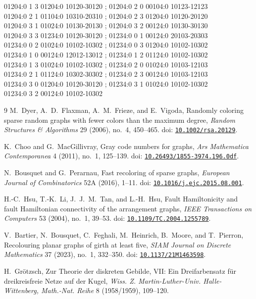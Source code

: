 \documentclass[11pt]{article}
\newcommand{\doi}[1]{doi: \href{https://doi.org/#1}{\nolinkurl{#1}}}
\theoremstyle{remark}
\numberwithin{equation}{section}
\begin{document}
\begin{flushleft}
01204:0 1 3 01204:0 10120-30120 ; 01204:0 2 0 00104:0 10123-12123\\
01204:0 2 1 01104:0 10310-20310 ; 01204:0 2 3 01204:0 10120-20120\\
01204:0 3 1 01024:0 10130-20130 ; 01204:0 3 2 00124:0 10130-30130\\
01204:0 3 3 01234:0 10120-30120 ; 01234:0 0 1 00124:0 20103-20303\\
01234:0 0 2 01024:0 10102-10302 ; 01234:0 0 3 01204:0 10102-10302\\
01234:0 1 0 00124:0 12012-13012 ; 01234:0 1 2 01124:0 10102-10302\\
01234:0 1 3 01024:0 10102-10302 ; 01234:0 2 0 01024:0 10103-12103\\
01234:0 2 1 01124:0 10302-30302 ; 01234:0 2 3 00124:0 10103-12103\\
01234:0 3 0 01204:0 10120-30120 ; 01234:0 3 1 01024:0 10102-10302\\
01234:0 3 2 00124:0 10102-10302\\
\end{flushleft}\endgroup

\begin{thebibliography}{9}
M.~Dyer, A.~D.~Flaxman, A.~M.~Frieze, and E.~Vigoda,
\newblock Randomly coloring sparse random graphs with fewer colors than the maximum degree,
\newblock \emph{Random Structures \& Algorithms} 29 (2006), no.~4, 450--465.
\newblock \doi{10.1002/rsa.20129}.

K.~Choo and G.~MacGillivray,
\newblock Gray code numbers for graphs,
\newblock \emph{Ars Mathematica Contemporanea} 4 (2011), no.~1, 125--139.
\newblock \doi{10.26493/1855-3974.196.0df}.

N.~Bousquet and G.~Perarnau,
\newblock Fast recoloring of sparse graphs,
\newblock \emph{European Journal of Combinatorics} 52A (2016), 1--11.
\newblock \doi{10.1016/j.ejc.2015.08.001}.

H.-C.~Hsu, T.-K.~Li, J.~J.~M.~Tan, and L.-H.~Hsu,
\newblock Fault Hamiltonicity and fault Hamiltonian connectivity of the arrangement graphs,
\newblock \emph{IEEE Transactions on Computers} 53 (2004), no.~1, 39--53.
\newblock \doi{10.1109/TC.2004.1255789}.

V.~Bartier, N.~Bousquet, C.~Feghali, M.~Heinrich, B.~Moore, and T.~Pierron,
\newblock Recolouring planar graphs of girth at least five,
\newblock \emph{SIAM Journal on Discrete Mathematics} 37 (2023), no.~1, 332--350.
\newblock \doi{10.1137/21M1463598}.

H.~Gr\"otzsch,
\newblock Zur Theorie der diskreten Gebilde, VII: Ein Dreifarbensatz f\"ur dreikreisfreie Netze auf der Kugel,
\newblock \emph{Wiss. Z. Martin-Luther-Univ. Halle-Wittenberg, Math.-Nat. Reihe} 8 (1958/1959), 109--120.
\end{thebibliography}
\end{document}
